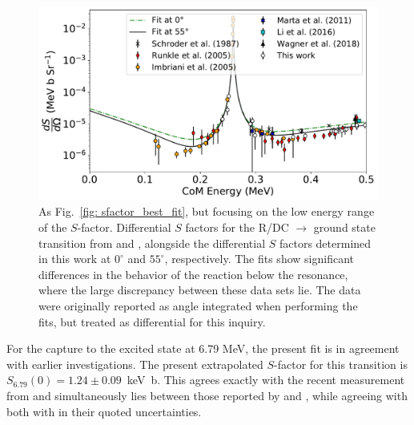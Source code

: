 \begin{figure}
\centering
\includegraphics[width=1.0\columnwidth]{./figures/diff_sfac_000_compare_low.pdf}
\caption{As Fig.~\ref{fig: sfactor_best_fit}, but focusing on the low energy range of the $S$-factor. Differential $S$ factors for the R/DC $\rightarrow$ ground state transition from \citet{Runkle2005} and \citet{Imbriani2005}, alongside the differential $S$ factors determined in this work at $0^\circ$ and $55^\circ$, respectively. The fits show significant differences in the behavior of the reaction below the resonance, where the large discrepancy between these data sets lie. The data were originally reported as angle integrated when performing the fits, but treated as differential for this inquiry.}
\label{fig: sfactor_best_low}
\end{figure}






For the capture to the excited state at 6.79 MeV, the present fit is in agreement with earlier investigations. The present extrapolated $S$-factor for this transition is $S_{6.79}(0) = 1.24 \pm 0.09$~keV~b. This agrees exactly with the recent measurement from \citet{Wagner2018} and simultaneously lies between those reported by \citet{Adelberger2011} and \citet{Li2016}, while agreeing with both with in their quoted uncertainties. 

